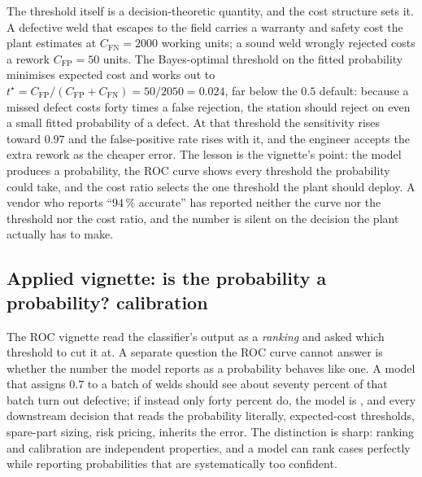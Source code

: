 

The threshold itself is a decision-theoretic quantity, and the cost
structure sets it. A defective weld that escapes to the field carries a
warranty and safety cost the plant estimates at $C_{\mathrm{FN}} =
2000$ working units; a sound weld wrongly rejected costs a rework
$C_{\mathrm{FP}} = 50$ units. The Bayes-optimal threshold on the fitted
probability minimises expected cost and works out to $t^{\star} =
C_{\mathrm{FP}}/(C_{\mathrm{FP}} + C_{\mathrm{FN}}) = 50/2050 =
0.024$, far below the $0.5$ default: because a missed defect costs
forty times a false rejection, the station should reject on even a
small fitted probability of a defect. At that threshold the sensitivity
rises toward $0.97$ and the false-positive rate rises with it, and the
engineer accepts the extra rework as the cheaper error. The lesson is
the vignette's point: the model produces a probability, the ROC curve
shows every threshold the probability could take, and the cost ratio
selects the one threshold the plant should deploy. A vendor who reports
``$94\,\%$ accurate'' has reported neither the curve nor the threshold
nor the cost ratio, and the number is silent on the decision the plant
actually has to make.

\subsection{Applied vignette: is the probability a probability? calibration}

The ROC vignette read the classifier's output as a \emph{ranking} and
asked which threshold to cut it at. A separate question the ROC curve
cannot answer is whether the number the model reports as a probability
behaves like one. A model that assigns $0.7$ to a batch of welds should
see about seventy percent of that batch turn out defective; if instead
only forty percent do, the model is , and every
downstream decision that reads the probability literally, expected-cost
thresholds, spare-part sizing, risk pricing, inherits the error. The
distinction is sharp: ranking and calibration are independent
properties, and a model can rank cases perfectly while reporting
probabilities that are systematically too confident.

